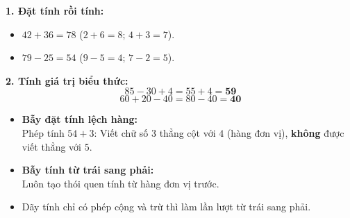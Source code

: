 \documentclass[11pt,a4paper]{article}
\begin{document}
\vspace{-1.5mm}
\noindent
\begin{minipage}[t]{0.49\textwidth}\vspace{0pt}
\begin{tcolorbox}[
  enhanced,
  colback=green!4!white,
  colframe=green!60!black,
  arc=2mm, boxrule=0.8pt,
  left=2mm, right=2mm, top=1.8mm, bottom=1.8mm,
  title={\footnotesize\bfseries\color{white}\faCheckCircle\ 4. Ví dụ thực hành chuẩn mực}
]
{\footnotesize
\textbf{1. Đặt tính rồi tính:}\\
\begin{itemize}\setlength{\itemsep}{0.5pt}\setlength{\leftskip}{-2.5mm}
  \item $42 + 36 = 78$ ($2+6=8$; $4+3=7$).
  \item $79 - 25 = 54$ ($9-5=4$; $7-2=5$).
\end{itemize}
\textbf{2. Tính giá trị biểu thức:}\\
$$85 - 30 + 4 = 55 + 4 = \mathbf{59}$$
$$60 + 20 - 40 = 80 - 40 = \mathbf{40}$$
}
\end{tcolorbox}
\end{minipage}
\hfill
\begin{minipage}[t]{0.49\textwidth}\vspace{0pt}
\begin{tcolorbox}[
  enhanced,
  colback=red!4!white,
  colframe=red!75!black,
  arc=2mm, boxrule=0.8pt,
  left=2mm, right=2mm, top=1.8mm, bottom=1.8mm,
  title={\footnotesize\bfseries\color{white}\faExclamationTriangle\ 5. Mẹo tránh bẫy trắc nghiệm}
]
{\footnotesize
\begin{itemize}\setlength{\itemsep}{1pt}\setlength{\leftskip}{-2.5mm}
  \item \textbf{Bẫy đặt tính lệch hàng:}\\
  Phép tính $54 + 3$: Viết chữ số $3$ thẳng cột với $4$ (hàng đơn vị), \textbf{không} được viết thẳng với $5$.
  \item \textbf{Bẫy tính từ trái sang phải:}\\
  Luôn tạo thói quen tính từ hàng đơn vị trước.
  \item Dãy tính chỉ có phép cộng và trừ thì làm lần lượt từ trái sang phải.
\end{itemize}
}
\end{tcolorbox}
\end{minipage}
\end{document}
